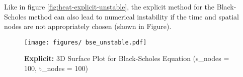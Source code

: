 Like in figure \ref{fig:heat-explicit-unstable}, the explicit method for the Black-Scholes method can also lead to numerical instability if the time and spatial nodes are not appropriately chosen (shown in Figure).

\begin{figure}[H]
    \centering
    \texttt{[image: figures/ bse\_unstable.pdf]}
    \caption{\textbf{Explicit:} 3D Surface Plot for Black-Scholes Equation (s\_nodes = 100, t\_nodes = 100)}
    \label{fig:bse-explicit-unstable}
\end{figure}




